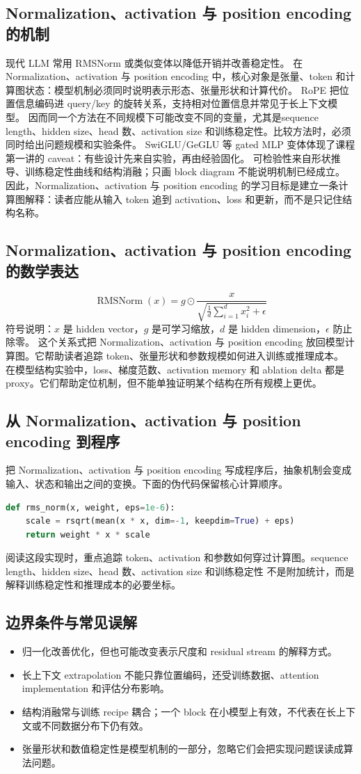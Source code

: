 \documentclass[a4paper]{article}
\begin{document}
\subsection{Normalization、activation 与 position encoding 的机制}
现代 LLM 常用 RMSNorm 或类似变体以降低开销并改善稳定性。 在 Normalization、activation 与 position encoding 中，核心对象是张量、token 和计算图状态：模型机制必须同时说明表示形态、张量形状和计算代价。
RoPE 把位置信息编码进 query/key 的旋转关系，支持相对位置信息并常见于长上下文模型。 因而同一个方法在不同规模下可能改变不同的变量，尤其是sequence length、hidden size、head 数、activation size 和训练稳定性。比较方法时，必须同时给出问题规模和实验条件。
SwiGLU/GeGLU 等 gated MLP 变体体现了课程第一讲的 caveat：有些设计先来自实验，再由经验固化。 可检验性来自形状推导、训练稳定性曲线和结构消融；只画 block diagram 不能说明机制已经成立。
因此，Normalization、activation 与 position encoding 的学习目标是建立一条计算图解释：读者应能从输入 token 追到 activation、loss 和更新，而不是只记住结构名称。
\subsection{Normalization、activation 与 position encoding 的数学表达}
\[\operatorname{RMSNorm}(x)=g\odot \frac{x}{\sqrt{\frac{1}{d}\sum_{i=1}^{d}x_i^2+\epsilon}}\]
符号说明：\(x\) 是 hidden vector，\(g\) 是可学习缩放，\(d\) 是 hidden dimension，\(\epsilon\) 防止除零。
这个关系式把 Normalization、activation 与 position encoding 放回模型计算图。它帮助读者追踪 token、张量形状和参数规模如何进入训练或推理成本。
在模型结构实验中，loss、梯度范数、activation memory 和 ablation delta 都是 proxy。它们帮助定位机制，但不能单独证明某个结构在所有规模上更优。
\subsection{从 Normalization、activation 与 position encoding 到程序}
把 Normalization、activation 与 position encoding 写成程序后，抽象机制会变成输入、状态和输出之间的变换。下面的伪代码保留核心计算顺序。
\begin{lstlisting}[language=Python]
def rms_norm(x, weight, eps=1e-6):
    scale = rsqrt(mean(x * x, dim=-1, keepdim=True) + eps)
    return weight * x * scale
\end{lstlisting}
阅读这段实现时，重点追踪 token、activation 和参数如何穿过计算图。sequence length、hidden size、head 数、activation size 和训练稳定性 不是附加统计，而是解释训练稳定性和推理成本的必要坐标。
\subsection{边界条件与常见误解}
\begin{itemize}
\item 归一化改善优化，但也可能改变表示尺度和 residual stream 的解释方式。
\item 长上下文 extrapolation 不能只靠位置编码，还受训练数据、attention implementation 和评估分布影响。
\item 结构消融常与训练 recipe 耦合；一个 block 在小模型上有效，不代表在长上下文或不同数据分布下仍有效。
\item 张量形状和数值稳定性是模型机制的一部分，忽略它们会把实现问题误读成算法问题。
\end{itemize}
\end{document}

